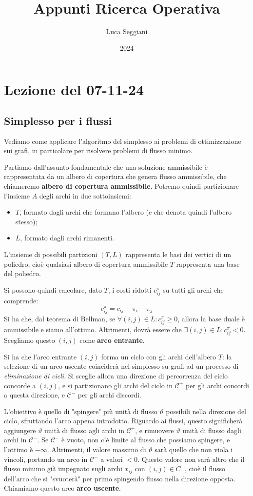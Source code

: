 \documentclass[a4paper,11pt]{article}
\title{Appunti Ricerca Operativa}
\author{Luca Seggiani}
\date{2024}
\begin{document}
\section{Lezione del 07-11-24}

\thispagestyle{empty}
\pagestyle{fancy}

\subsection{Simplesso per i flussi}
Vediamo come applicare l'algoritmo del simplesso ai problemi di ottimizzazione sui grafi, in particolare per risolvere problemi di flusso minimo. 

Partiamo dall'assunto fondamentale che una soluzione ammissibile è rappresentata da un albero di copertura che genera flusso ammissibile, che chiameremo \textbf{albero di copertura ammissibile}.
Potremo quindi partizionare l'insieme $A$ degli archi in due sottoinsiemi:
\begin{itemize}
	\item $T$, formato dagli archi che formano l'albero (e che denota quindi l'albero stesso);
	\item $L$, formato dagli archi rimanenti.
\end{itemize}

L'insieme di possibili partizioni $(T, L)$ rappresenta le basi dei vertici di un poliedro, cioè qualsiasi albero di copertura ammissibile $T$ rappresenta una base del poliedro.

Si possono quindi calcolare, dato $T$, i costi ridotti $c_{ij}^\pi$ su tutti gli archi che comprende:
$$
c_{ij}^\pi = c_{ij} + \pi_i - \pi_j
$$
Si ha che, dal teorema di Bellman, se $\forall (i, j) \in L : c_{ij}^\pi \geq 0$, allora la base duale è ammissibile e siamo all'ottimo.
Altrimenti, dovrà essere che $\exists (i,j) \in L : c_{ij}^\pi < 0$. Scegliamo questo $(i, j)$ come \textbf{arco entrante}.

Si ha che l'arco entrante $(i, j)$ forma un ciclo con gli archi dell'albero $T$: la selezione di un arco uscente coinciderà nel simplesso su grafi ad un processo di \textit{eliminazione di cicli}.
Si sceglie allora una direzione di percorrenza del ciclo concorde a $(i, j)$, e si partizionano gli archi del ciclo in $\mathcal{C}^+$ per gli archi concordi a questa direzione, e $\mathcal{C}^-$ per gli archi discordi.

L'obiettivo è quello di "spingere" più unità di flusso $\vartheta$ possibili nella direzione del ciclo, sfruttando l'arco appena introdotto.
Riguardo ai flussi, questo significherà aggiungere $\vartheta$ unità di flusso agli archi in $\mathcal{C}^+$, e rimuovere $\vartheta$ unità di flusso dagli archi in $\mathcal{C}^-$.
Se $\mathcal{C}^-$ è vuoto, non c'è limite al flusso che possiamo spingere, e l'ottimo è $-\infty$. 
Altrimenti, il valore massimo di $\vartheta$ sarà quello che non viola i vincoli, portando un arco in $\mathcal{C}^-$ a valori $<0$. 
Questo valore non sarà altro che il flusso minimo già impegnato sugli archi $x_{ij}$ con $(i, j) \in C^-$, cioè il flusso dell'arco che si "svuoterà" per primo spingendo flusso nella direzione opposta.
Chiamiamo questo arco \textbf{arco uscente}.
\end{document}
